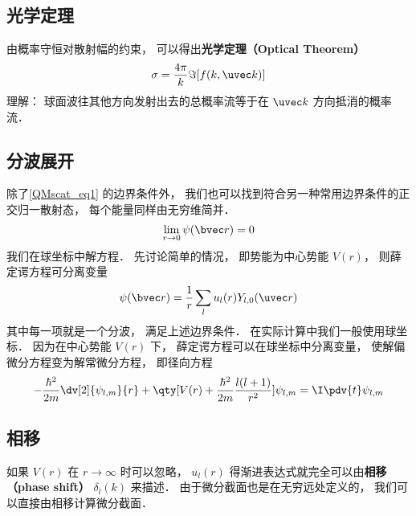 \subsection{光学定理}
由概率守恒对散射幅的约束， 可以得出\textbf{光学定理（Optical Theorem）}
\begin{equation}
\sigma = \frac{4\pi}{k} \Im[f(k, \uvec k)]
\end{equation}
理解： 球面波往其他方向发射出去的总概率流等于在 $\uvec k$ 方向抵消的概率流．

\subsection{分波展开}

除了\autoref{QMscat_eq1} 的边界条件外， 我们也可以找到符合另一种常用边界条件的正交归一散射态， 每个能量同样由无穷维简并．
\begin{equation}
\lim_{r\to 0} \psi(\bvec r) = 0
\end{equation}
我们在球坐标中解方程． 先讨论简单的情况， 即势能为中心势能 $V(r)$， 则薛定谔方程可分离变量 %
\begin{equation}
\psi(\bvec r) = \frac{1}{r} \sum_l u_l(r) Y_{l,0}(\uvec r)
\end{equation}
其中每一项就是一个分波， 满足上述边界条件． 在实际计算中我们一般使用球坐标． 因为在中心势能 $V(r)$ 下， 薛定谔方程可以在球坐标中分离变量， 使解偏微分方程变为解常微分方程， 即径向方程 %
\begin{equation}
-\frac{\hbar^2}{2m} \dv[2]{\psi_{l,m}}{r} + \qty[V(r) + \frac{\hbar^2}{2m}\frac{l(l + 1)}{r^2}]\psi_{l,m} = \I \pdv{t} \psi_{l,m}
\end{equation}

\subsection{相移}
如果 $V(r)$ 在 $r\to\infty$ 时可以忽略， $u_l(r)$ 得渐进表达式就完全可以由\textbf{相移（phase shift）} $\delta_l(k)$ 来描述． 由于微分截面也是在无穷远处定义的， 我们可以直接由相移计算微分截面．

